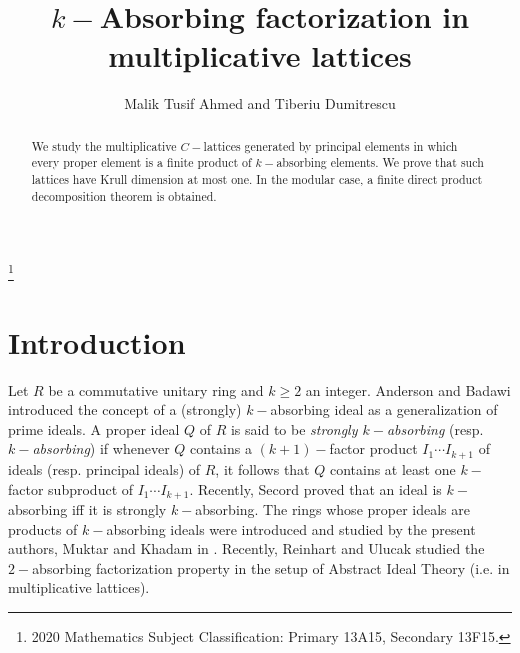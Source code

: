 \documentclass{amsart}
\theoremstyle{plain}
\theoremstyle{definition}
\theoremstyle{remark}
\begin{document}
\title{$k-$Absorbing factorization in multiplicative lattices}

 
\author{Malik Tusif Ahmed and Tiberiu Dumitrescu}
%


\address{ Department of Mathematics and Statistics, Hazara University,
Mansehra, Pakistan}


\address{Facultatea de Matematica si Informatica, University of Bucharest, 14 A\-ca\-de\-mi\-ei Str., Bucharest, RO 010014, Romania}


 





\thanks{2020 Mathematics Subject Classification: Primary 13A15, Secondary 13F15.}





\begin{abstract}
We study the multiplicative $C-$lattices generated by principal elements in which every proper element is a finite product of $k-$absorbing elements. We prove that such lattices have Krull dimension at most one. In the modular case, a finite direct product decomposition theorem is obtained.
\end{abstract}


\maketitle

\section{Introduction}
Let $R$ be a commutative unitary ring and $k\geq 2$ an integer.
Anderson and Badawi \cite{B,AB} introduced the concept of a (strongly) $k-$absorbing ideal  as a generalization of  prime ideals.
A proper ideal $Q$ of $R$ is said to be {\em strongly $k-$absorbing} (resp. {\em  $k-$absorbing}) if   whenever $Q$ contains a $(k+1)-$factor product 
$I_1\cdots I_{k+1}$ of ideals (resp. principal ideals) of $R$, it follows that $Q$ contains at least one $k-$factor subproduct of $I_1\cdots I_{k+1}$.
Recently, Secord \cite{S} proved that an ideal is $k-$absorbing iff it is strongly $k-$absorbing. The rings whose proper ideals are products of $k-$absorbing ideals were introduced and studied by the present authors, Muktar and Khadam  in \cite{MAD,ADK}.
Recently, Reinhart and Ulucak \cite{RU} studied the $2-$absorbing factorization property in the setup of Abstract Ideal Theory (i.e. in multiplicative lattices). 
\end{document}
